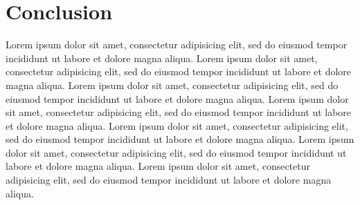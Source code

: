 \documentclass[%
 reprint,
 amsmath,amssymb,
 aps,
floatfix,
]{revtex4-1}
\begin{document}
\section{Conclusion}   %
Lorem ipsum dolor sit amet, consectetur adipisicing elit, sed do eiusmod tempor incididunt ut labore et dolore magna aliqua. Lorem ipsum dolor sit amet, consectetur adipisicing elit, sed do eiusmod tempor incididunt ut labore et dolore magna aliqua. Lorem ipsum dolor sit amet, consectetur adipisicing elit, sed do eiusmod tempor incididunt ut labore et dolore magna aliqua. Lorem ipsum dolor sit amet, consectetur adipisicing elit, sed do eiusmod tempor incididunt ut labore et dolore magna aliqua. Lorem ipsum dolor sit amet, consectetur adipisicing elit, sed do eiusmod tempor incididunt ut labore et dolore magna aliqua. Lorem ipsum dolor sit amet, consectetur adipisicing elit, sed do eiusmod tempor incididunt ut labore et dolore magna aliqua. Lorem ipsum dolor sit amet, consectetur adipisicing elit, sed do eiusmod tempor incididunt ut labore et dolore magna aliqua.
\colorbox{BrickRed}{\color{White}{Incomplete.}}

\end{document}
